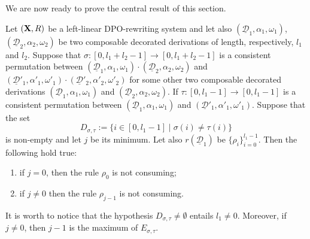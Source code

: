 \documentclass[a4paper,UKenglish,cleveref,pdftex, thm-restate,numberwithinsect]{lipics}
\def\X{\textbf {\textup{X}}}
\newcommand{\dder}[1]{\mathscr{#1}}
\newcommand{\der}[1]{\underline{\dder{#1}}}
\begin{document}
We are now ready to prove the central result of this section. 
\begin{lemma}\label{lem:impo}
	Let $(\X,R)$ be a left-linear DPO-rewriting system and let also $(\der{D}_1, \alpha_1, \omega_1)$, $(\der{D}_2, \alpha_2, \omega_2)$ be two composable decorated derivations of length, respectively, $l_1$ and $l_2$. Suppose that $\sigma:[0, l_1+l_2-1]\to [0, l_1+l_2-1]$ is a consistent permutation between $(\der{D}_1, \alpha_1, \omega_1)\cdot (\der{D}_2, \alpha_2, \omega_2)$ and $(\der{D}'_1, \alpha'_1, \omega'_1)\cdot (\der{D}'_2, \alpha'_2, \omega'_2)$ for some other two composable decorated derivations $(\der{D}_1, \alpha_1, \omega_1)$ and $(\der{D}_2, \alpha_2, \omega_2)$.  If $\tau:[0,l_1-1]\to [0, l_1-1]$ is a consistent permutation between $(\der{D}_1, \alpha_1, \omega_1)$ and $(\der{D}'_1, \alpha'_1, \omega'_1)$. Suppose that  the set 
	\[D_{\sigma, \tau}:=\{i\in [0, l_1-1]\mid \sigma(i)\neq \tau(i)\}\]
	is non-empty and let $j$ be its minimum. Let also $r(\der{D}_1)$ be $\{\rho_i\}_{i=0}^{l_1-1}$. Then the following hold true:
	\begin{enumerate}
		\item if $j=0$, then the rule $\rho_0$ is not consuming;
		\item if $j\neq 0$ then the rule $\rho_{j-1}$ is not consuming.
	\end{enumerate}
\end{lemma}
\begin{remark}\label{rem:minmax}It is worth to notice that the hypothesis $D_{\sigma, \tau} \neq \emptyset$ entails $l_1\neq 0$. Moreover, if $j\neq 0$, then $j-1$ is the maximum of $E_{\sigma, \tau}$.
\end{remark}
\end{document}
